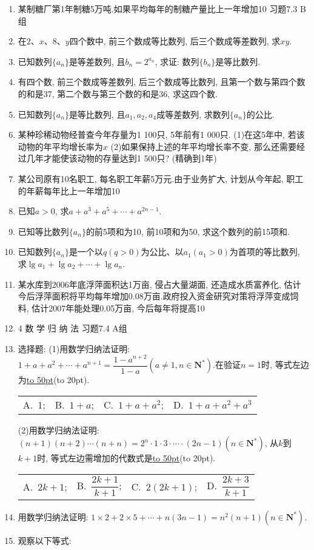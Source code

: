 \documentclass[10pt,a4paper]{article}
\newcommand{\blank}[1]{\underline{\hbox to #1pt{}}}
\newcommand{\bracket}[1]{(\hbox to #1pt{})}
\newcommand{\fourch}[4]{\par\begin{tabular}{p{.23\textwidth}p{.23\textwidth}p{.23\textwidth}p{.23\textwidth}}
A.~#1 &B.~#2& C.~#3& D.~#4
\end{tabular}}
\begin{document}
\begin{enumerate}[1.]
\item 某制糖厂第1年制糖5万吨.如果平均每年的制糖产量比上一年增加10%
习题7.3  B组
\item 在$2$、$x$、$8$、$y$四个数中, 前三个数成等比数列, 后三个数成等差数列, 求$xy$.
\item 已知数列$\{a_n\}$是等差数列, 且$b_n=2^{a_n}$, 求证: 数列$\{b_n\}$是等比数列.
\item 有四个数, 前三个数成等差数列, 后三个数成等比数列, 且第一个数与第四个数的和是37, 第二个数与第三个数的和是36, 求这四个数.
\item 已知数列$\{a_n\}$是等比数列, 且$a_1,a_2,a_4$成等差数列, 求数列$\{a_n\}$的公比.
\item 某种珍稀动物经普查今年存量为1 100只, 5年前有1 000只.
(1)在这5年中, 若该动物的年平均增长率为$x$%
(2)如果保持上述的年平均增长率不变, 那么还需要经过几年才能使该动物的存量达到1 500只? (精确到1年)
\item 某公司原有10名职工, 每名职工年薪5万元.由于业务扩大, 计划从今年起, 职工的年薪每年比上一年增加10%
\item 已知$a>0$, 求$a+a^3+a^5+\cdots +a^{2n-1}$.
\item 已知等比数列$\{a_n\}$的前5项和为10, 前10项和为50, 求这个数列的前15项和.
\item 已知数列$\{a_n\}$是一个以$q(q>0)$为公比、以$a_1(a_1>0)$为首项的等比数列, 求$\lg a_1+\lg a_2+\cdots +\lg a_n$.
\item 某水库到2006年底浮萍面积达1万亩, 侵占大量湖面, 还造成水质富养化, 估计今后浮萍面积将平均每年增加0.08万亩.政府投入资金研究对策将浮萍变成饲料, 估计2007年能处理0.05万亩, 今后每年将提高10%
\item 4  数 学 归 纳 法
习题7.4  A组
\item 选择题:
(1)用数学归纳法证明: $1+a+a^2+\cdots +a^{n+1}=\dfrac{1-{a^{n+2}}}{1-a}(a\ne 1,n\in \mathbf{N}^*)$.在验证$n=1$时, 等式左边为\blank{50}\bracket{20}.
\fourch{1;}{$1+a$;}{$1+a+a^2$;}{$1+a+a^2+a^3$}
(2)用数学归纳法证明: $(n+1)(n+2)\cdots (n+n)=2^n\cdot 1\cdot 3\cdot \cdots \cdot (2n-1)(n\in \mathbf{N}^*)$, 从$k$到$k+1$时, 等式左边需增加的代数式是\blank{50}\bracket{20}.
\fourch{$2k+1$;}{$\dfrac{2k+1}{k+1}$;}{$2(2k+1)$;}{$\dfrac{2k+3}{k+1}$}
\item 用数学归纳法证明: $1\times 2+2\times 5+\cdots +n(3n-1)=n^2(n+1)(n\in \mathbf{N}^*)$.
\item 观察以下等式:

\end{enumerate}
\end{document}
